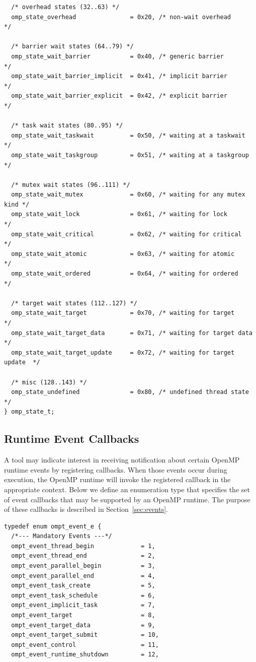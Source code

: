 \documentclass{article}
\begin{document}
{\begin{verbatim}
  /* overhead states (32..63) */
  omp_state_overhead               = 0x20, /* non-wait overhead          */

  /* barrier wait states (64..79) */
  omp_state_wait_barrier           = 0x40, /* generic barrier            */
  omp_state_wait_barrier_implicit  = 0x41, /* implicit barrier           */
  omp_state_wait_barrier_explicit  = 0x42, /* explicit barrier           */
    
  /* task wait states (80..95) */
  omp_state_wait_taskwait          = 0x50, /* waiting at a taskwait      */
  omp_state_wait_taskgroup         = 0x51, /* waiting at a taskgroup     */
	
  /* mutex wait states (96..111) */	
  omp_state_wait_mutex             = 0x60, /* waiting for any mutex kind */      	    
  omp_state_wait_lock              = 0x61, /* waiting for lock           */
  omp_state_wait_critical          = 0x62, /* waiting for critical       */
  omp_state_wait_atomic            = 0x63, /* waiting for atomic         */
  omp_state_wait_ordered           = 0x64, /* waiting for ordered        */
  
  /* target wait states (112..127) */
  omp_state_wait_target            = 0x70, /* waiting for target         */ 
  omp_state_wait_target_data       = 0x71, /* waiting for target data    */ 
  omp_state_wait_target_update     = 0x72, /* waiting for target update  */ 

  /* misc (128..143) */
  omp_state_undefined              = 0x80, /* undefined thread state     */
} omp_state_t;
\end{verbatim}
\clearpage
\subsection{Runtime Event Callbacks}
\label{appendix:ompt-types:events}

A tool may indicate interest in receiving notification about certain OpenMP runtime events by registering callbacks. 
When those events occur during execution, the OpenMP runtime will invoke the registered callback in the appropriate context.
Below we define an enumeration type that specifies the set of event callbacks that may be supported by an OpenMP runtime. 
The purpose of these callbacks is described in Section~\ref{sec:events}. 

\begin{verbatim}
typedef enum ompt_event_e {  
  /*--- Mandatory Events ---*/
  ompt_event_thread_begin             = 1,  
  ompt_event_thread_end               = 2,  
  ompt_event_parallel_begin           = 3,  
  ompt_event_parallel_end             = 4,  
  ompt_event_task_create              = 5,  
  ompt_event_task_schedule            = 6,
  ompt_event_implicit_task            = 7,      
  ompt_event_target                   = 8,  
  ompt_event_target_data              = 9,  
  ompt_event_target_submit            = 10,  
  ompt_event_control                  = 11,   
  ompt_event_runtime_shutdown         = 12,  


\end{verbatim}}
\end{document}
